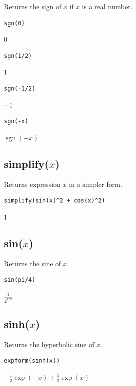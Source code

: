 \documentclass[12pt]{article}
\begin{document}
Returns the sign of $x$ if $x$ is a real number.

{\color{blue}
\begin{verbatim}
sgn(0)
\end{verbatim}
}

$0$

{\color{blue}
\begin{verbatim}
sgn(1/2)
\end{verbatim}
}

$1$

{\color{blue}
\begin{verbatim}
sgn(-1/2)
\end{verbatim}
}

$-1$

{\color{blue}
\begin{verbatim}
sgn(-x)
\end{verbatim}
}

$\operatorname{sgn}(-x)$

\subsection*{simplify($x$)}

Returns expression $x$ in a simpler form.

{\color{blue}
\begin{verbatim}
simplify(sin(x)^2 + cos(x)^2)
\end{verbatim}
}

$1$

\subsection*{sin($x$)}

Returns the sine of $x$.

{\color{blue}
\begin{verbatim}
sin(pi/4)
\end{verbatim}
}

$\displaystyle \frac{1}{2^{1/2}}$

\subsection*{sinh($x$)}

Returns the hyperbolic sine of $x$.

{\color{blue}
\begin{verbatim}
expform(sinh(x))
\end{verbatim}
}

$\displaystyle -\tfrac{1}{2}\exp(-x)+\tfrac{1}{2}\exp(x)$
\end{document}
